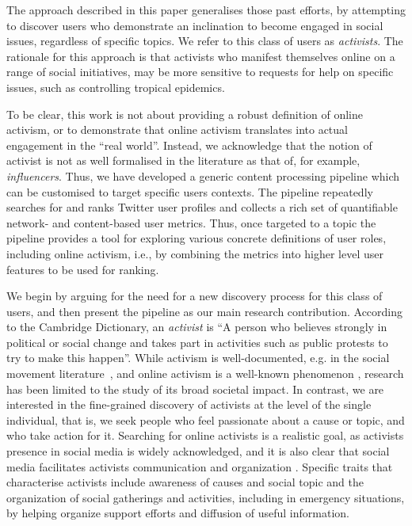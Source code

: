 \documentclass[runningheads]{llncs}
\begin{document}
The approach described in this paper generalises those past efforts, by attempting to discover users who demonstrate an inclination to become engaged in social issues, regardless of specific topics. 
We refer to this class of users as \textit{activists}.
The rationale for this approach is that activists who manifest themselves online on a range of social initiatives, may be more sensitive to requests for help on specific issues,  such as controlling tropical epidemics.

To be clear, this work is not about providing a robust definition of online activism, or to demonstrate that online activism translates into actual engagement in the ``real world''.
%
Instead, we acknowledge that the notion of activist is not as well formalised in the literature as that of, for example, \textit{influencers}. 
Thus, we have developed a generic content processing pipeline which can be customised to target specific users contexts. 
The pipeline repeatedly searches for and ranks Twitter user profiles and collects a rich set of quantifiable network- and content-based user metrics. 
Thus, once targeted to a topic the pipeline provides a tool for exploring various concrete definitions of user roles, including online activism, i.e., by combining the metrics into higher level user features to be used for ranking.

We begin by arguing for the need for a new discovery process for this class of users, and then present the pipeline as our main research contribution.
%
According to the Cambridge Dictionary, an \textit{activist} is  ``A person who believes strongly in political or social change and takes part in activities such as public protests to try to make this happen''.
%
While activism is well-documented, e.g. in the social movement literature~\cite{doi:10.1080/14742830701497277}, and online activism is a well-known phenomenon \cite{IJoC1246}, research has been limited to the study of its broad societal impact. 
In contrast, we are interested in the fine-grained discovery of activists at the level of the single individual, that is, we seek people who feel passionate about a cause or topic, and who take action for it. 
Searching for online activists is a realistic goal, as activists presence in social media is widely acknowledged, and it is also clear that social media facilitates activists communication and organization \cite{Poell2014,Youmans2012}.  
Specific traits that characterise activists include awareness of causes and social topic and the organization of social gatherings and activities, including in emergency situations, by helping organize support efforts and diffusion of useful information.
 
\end{document}
